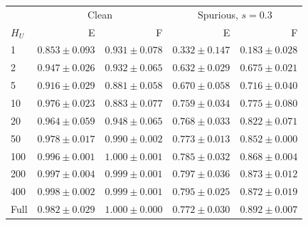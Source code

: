 \begin{tabular*}{\columnwidth}{@{\extracolsep{\fill}}lrrrr@{}}
\toprule
& \multicolumn{2}{c}{Clean} & \multicolumn{2}{c}{Spurious, $s=0.3$} \\
$H_U$ & E & F & E & F \\
\midrule
1 & $0.853{\pm}0.093$ & $0.931{\pm}0.078$ & $0.332{\pm}0.147$ & $0.183{\pm}0.028$ \\
2 & $0.947{\pm}0.026$ & $0.932{\pm}0.065$ & $0.632{\pm}0.029$ & $0.675{\pm}0.021$ \\
5 & $0.916{\pm}0.029$ & $0.881{\pm}0.058$ & $0.670{\pm}0.058$ & $0.716{\pm}0.040$ \\
10 & $0.976{\pm}0.023$ & $0.883{\pm}0.077$ & $0.759{\pm}0.034$ & $0.775{\pm}0.080$ \\
20 & $0.964{\pm}0.059$ & $0.948{\pm}0.065$ & $0.768{\pm}0.033$ & $0.822{\pm}0.071$ \\
50 & $0.978{\pm}0.017$ & $0.990{\pm}0.002$ & $0.773{\pm}0.013$ & $0.852{\pm}0.000$ \\
100 & $0.996{\pm}0.001$ & $1.000{\pm}0.001$ & $0.785{\pm}0.032$ & $0.868{\pm}0.004$ \\
200 & $0.997{\pm}0.004$ & $0.999{\pm}0.001$ & $0.797{\pm}0.036$ & $0.873{\pm}0.012$ \\
400 & $0.998{\pm}0.002$ & $0.999{\pm}0.001$ & $0.795{\pm}0.025$ & $0.872{\pm}0.019$ \\
\midrule
Full & $0.982{\pm}0.029$ & $1.000{\pm}0.000$ & $0.772{\pm}0.030$ & $0.892{\pm}0.007$ \\
\bottomrule
\end{tabular*}
